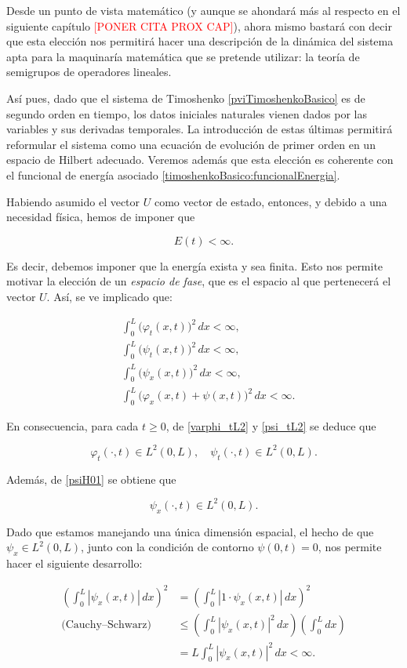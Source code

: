 Desde un punto de vista matemático (y aunque se ahondará más al respecto en el siguiente capítulo \textcolor{red}{[PONER CITA PROX CAP]}), ahora mismo bastará con decir que esta elección nos permitirá hacer una descripción de la dinámica del sistema apta para la maquinaría matemática que se pretende utilizar: la teoría de semigrupos de operadores lineales. 

Así pues, dado que el sistema de Timoshenko \eqref{pviTimoshenkoBasico} es de segundo orden en tiempo, los datos iniciales naturales vienen dados por las variables y sus derivadas temporales. La introducción de estas últimas permitirá reformular el sistema como una ecuación de evolución de primer orden en un espacio de Hilbert adecuado. Veremos además que esta elección es coherente con el funcional de energía asociado \eqref{timoshenkoBasico:funcionalEnergia}.

Habiendo asumido el vector $U$ como vector de estado, entonces, y debido a una necesidad física, hemos de imponer que

\[E(t) < \infty.\]

Es decir, debemos imponer que la energía exista y sea finita. Esto nos permite motivar la elección de un \textit{espacio de fase}, que es el espacio al que pertenecerá el vector $U$. Así, se ve implicado que:

\begin{align}
    &\int_0^L \big(\varphi_t(x,t) \big)^2 \, dx < \infty,\label{varphi_tL2}\\
    &\int_0^L \big(\psi_t(x,t) \big)^2 \, dx < \infty,\label{psi_tL2}\\
    &\int_0^L \big(\psi_x(x,t) \big)^2 \, dx < \infty,\label{psiH01}\\
    &\int_0^L \big(\varphi_x(x,t) + \psi(x,t) \big)^2 \, dx < \infty\label{varphiH01}.
\end{align}

En consecuencia, para cada $t \geq 0$, de \eqref{varphi_tL2} y \eqref{psi_tL2} se deduce que

\[
\varphi_t(\cdot,t)\in L^2(0,L), \quad \psi_t(\cdot,t)\in L^2(0,L).
\]

Además, de \eqref{psiH01} se obtiene que

\[
\psi_x(\cdot,t)\in L^2(0,L).
\]

Dado que estamos manejando una única dimensión espacial, el hecho de que $\psi_x \in L^2(0,L)$, junto con la condición de contorno $\psi(0,t) = 0$, nos permite hacer el siguiente desarrollo:

\begin{align*}
    \left (\int_0^L |\psi_x(x,t)| \, dx \right )^2 &= \left (\int_0^L |1 \cdot \psi_x(x,t)| \, dx \right )^2\\
    \text{(Cauchy–Schwarz)} &\leq \left (\int_0^L |\psi_x(x,t)|^2 \, dx \right ) \left (\int_0^L dx \right )\\
    &= L \int_0^L |\psi_x(x,t)|^2 \, dx < \infty.
\end{align*}

